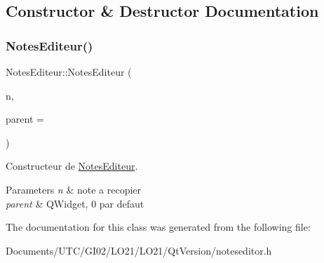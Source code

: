 \subsection{Constructor \& Destructor Documentation}
\mbox{\label{class_notes_editeur_a82a1e8c5d91db63ddf3bcc279ddc54b2}} 
\subsubsection{\texorpdfstring{Notes\+Editeur()}{NotesEditeur()}}
{\footnotesize\ttfamily Notes\+Editeur\+::\+Notes\+Editeur (\begin{DoxyParamCaption}\item[{\hyperlink{class_note}{Note} $\ast$}]{n,  }\item[{Q\+Widget $\ast$}]{parent = {} }\end{DoxyParamCaption})}



Constructeur de \hyperlink{class_notes_editeur}{Notes\+Editeur}. 


\begin{DoxyParams}{Parameters}
{\em n} & note a recopier \\
\hline
{\em parent} & Q\+Widget, 0 par defaut \\
\hline
\end{DoxyParams}


The documentation for this class was generated from the following file\+:\begin{DoxyCompactItemize}
\item 
Documents/\+U\+T\+C/\+G\+I02/\+L\+O21/\+L\+O21/\+Qt\+Version/noteseditor.\+h\end{DoxyCompactItemize}
